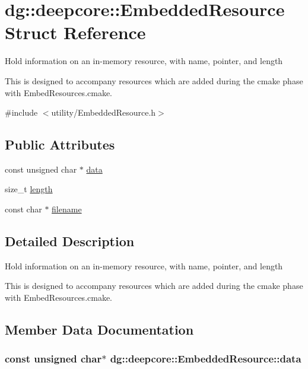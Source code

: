 \hypertarget{structdg_1_1deepcore_1_1_embedded_resource}{}\section{dg\+:\+:deepcore\+:\+:Embedded\+Resource Struct Reference}
\label{structdg_1_1deepcore_1_1_embedded_resource}


Hold information on an in-\/memory resource, with name, pointer, and length

This is designed to accompany resources which are added during the cmake phase with Embed\+Resources.\+cmake.  




{\ttfamily \#include $<$utility/\+Embedded\+Resource.\+h$>$}

\subsection*{Public Attributes}
\begin{DoxyCompactItemize}
\item 
const unsigned char $\ast$ \hyperlink{structdg_1_1deepcore_1_1_embedded_resource_a6f46534d2ed8e52a2d738e6b23bdc095}{data}
\item 
size\+\_\+t \hyperlink{structdg_1_1deepcore_1_1_embedded_resource_a34bcaf8f6488a7a6922bbdfb1da4a762}{length}
\item 
const char $\ast$ \hyperlink{structdg_1_1deepcore_1_1_embedded_resource_a9ff84df73c72ee45a88daf20a9e90459}{filename}
\end{DoxyCompactItemize}


\subsection{Detailed Description}
Hold information on an in-\/memory resource, with name, pointer, and length

This is designed to accompany resources which are added during the cmake phase with Embed\+Resources.\+cmake. 

\subsection{Member Data Documentation}
\subsubsection[{\texorpdfstring{data}{data}}]{\setlength{\rightskip}{0pt plus 5cm}const unsigned char$\ast$ dg\+::deepcore\+::\+Embedded\+Resource\+::data}\hypertarget{structdg_1_1deepcore_1_1_embedded_resource_a6f46534d2ed8e52a2d738e6b23bdc095}{}\label{structdg_1_1deepcore_1_1_embedded_resource_a6f46534d2ed8e52a2d738e6b23bdc095}
